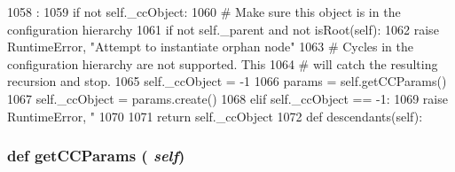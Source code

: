 \begin{DoxyCode}
1058                          :
1059         if not self._ccObject:
1060             # Make sure this object is in the configuration hierarchy
1061             if not self._parent and not isRoot(self):
1062                 raise RuntimeError, "Attempt to instantiate orphan node"
1063             # Cycles in the configuration hierarchy are not supported. This
1064             # will catch the resulting recursion and stop.
1065             self._ccObject = -1
1066             params = self.getCCParams()
1067             self._ccObject = params.create()
1068         elif self._ccObject == -1:
1069             raise RuntimeError, "%
1070                   %
1071         return self._ccObject
1072 
    def descendants(self):
\end{DoxyCode}
\hypertarget{classm5_1_1SimObject_1_1SimObject_a36ab56dcaec2e212c312d75510a1ff15}{
\subsubsection[{getCCParams}]{\setlength{\rightskip}{0pt plus 5cm}def getCCParams ( {\em self})}}
\label{classm5_1_1SimObject_1_1SimObject_a36ab56dcaec2e212c312d75510a1ff15}



